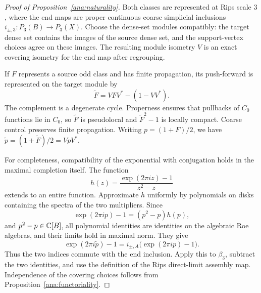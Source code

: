 \begin{proof}[Proof of Proposition~\ref{ana:naturality}]
Both classes are represented at Rips scale $3$, where the end maps are
proper continuous coarse simplicial inclusions
$i_{\pm,3}:P_3(B)\to P_3(X)$.  Choose the dense-set modules compatibly:
the target dense set contains the images of the source dense set, and
the support-vertex choices agree on these images.  The resulting module
isometry $V$ is an exact covering isometry for the end map after
regrouping.

If $F$ represents a source odd class and has finite propagation, its
push-forward is represented on the target module by
\[
 \widetilde F=VFV^*-(1-VV^*).
\]
The complement is a degenerate cycle.  Properness ensures that pullbacks
of $C_0$ functions lie in $C_0$, so $\widetilde F$ is pseudolocal and
$\widetilde F^2-1$ is locally compact.  Coarse control preserves finite
propagation.  Writing $p=(1+F)/2$, we have
$\widetilde p=(1+\widetilde F)/2=VpV^*$.

For completeness, compatibility of the exponential with conjugation
holds in the maximal completion itself.  The function
\[
 h(z)=\frac{\exp(2\pi i z)-1}{z^2-z}
\]
extends to an entire function.  Approximate $h$ uniformly by polynomials
on disks containing the spectra of the two multipliers.  Since
\[
 \exp(2\pi i p)-1=(p^2-p)h(p),
\]
and $p^2-p\in\mathbb C[B]$, all polynomial identities are identities on the
algebraic Roe algebras, and their limits hold in maximal norm.  They give
\[
 \exp(2\pi i\widetilde p)-1
   =i_{\pm,A}\bigl(\exp(2\pi i p)-1\bigr).
\]
Thus the two indices commute with the end inclusion.  Apply this to
$\beta_3$, subtract the two identities, and use the definition of the
Rips direct-limit assembly map.  Independence of the covering choices
follows from Proposition~\ref{ana:functoriality}.
\end{proof}
